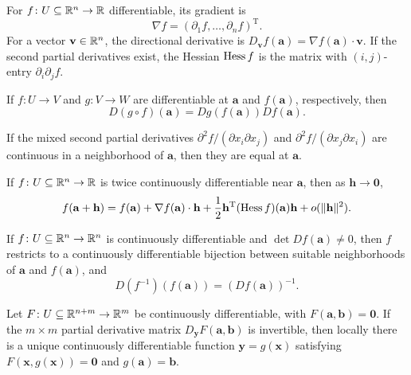 \begin{definition}
For $f\colon U\subseteq\mathbb{R}^n\to\mathbb{R}$ differentiable, its gradient is
\[
 \nabla f=(\partial_1f,\dots,\partial_nf)^{\mathrm{T}}.
\]
For a vector $\mathbf{v}\in\mathbb{R}^n$, the directional derivative is $D_{\mathbf{v}}f(\mathbf{a})=\nabla f(\mathbf{a})\cdot\mathbf{v}$. If the second partial derivatives exist, the Hessian $\operatorname{Hess} f$ is the matrix with $(i,j)$-entry $\partial_i\partial_j f$.
\end{definition}

\begin{theorem}
If $f\colon U\to V$ and $g\colon V\to W$ are differentiable at $\mathbf{a}$ and $f(\mathbf{a})$, respectively, then
\[
 D(g\circ f)(\mathbf{a})=Dg(f(\mathbf{a}))Df(\mathbf{a}).
\]
\end{theorem}

\begin{theorem}
If the mixed second partial derivatives $\partial^2 f/(\partial x_i\partial x_j)$ and $\partial^2 f/(\partial x_j\partial x_i)$ are continuous in a neighborhood of $\mathbf{a}$, then they are equal at $\mathbf{a}$.
\end{theorem}

\begin{theorem}
If $f\colon U\subseteq\mathbb{R}^n\to\mathbb{R}$ is twice continuously differentiable near $\mathbf{a}$, then as $\mathbf{h}\to\mathbf0$,
\[
 f(\mathbf{a}+\mathbf{h})=f(\mathbf{a})+\nabla f(\mathbf{a})\cdot\mathbf{h}
 +\frac12\mathbf{h}^{\mathrm{T}}(\operatorname{Hess} f)(\mathbf{a})\mathbf{h}
 +o(\|\mathbf{h}\|^2).
\]
\end{theorem}

\begin{theorem}
If $f\colon U\subseteq\mathbb{R}^n\to\mathbb{R}^n$ is continuously differentiable and $\det Df(\mathbf{a})\ne0$, then $f$ restricts to a continuously differentiable bijection between suitable neighborhoods of $\mathbf{a}$ and $f(\mathbf{a})$, and
\[
 D(f^{-1})(f(\mathbf{a}))=(Df(\mathbf{a}))^{-1}.
\]
\end{theorem}

\begin{theorem}
Let $F\colon U\subseteq\mathbb{R}^{n+m}\to\mathbb{R}^m$ be continuously differentiable, with $F(\mathbf{a},\mathbf{b})=\mathbf0$. If the $m\times m$ partial derivative matrix $D_{\mathbf{y}}F(\mathbf{a},\mathbf{b})$ is invertible, then locally there is a unique continuously differentiable function $\mathbf{y}=g(\mathbf{x})$ satisfying $F(\mathbf{x},g(\mathbf{x}))=\mathbf0$ and $g(\mathbf{a})=\mathbf{b}$.
\end{theorem}

